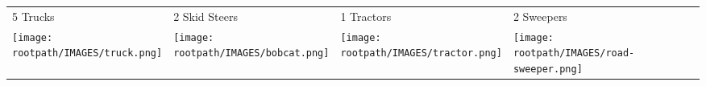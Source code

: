 \begin{tabular}{m{}m{}m{}m{}}
    {\color{ccorange} 5 Trucks} & {\color{ccorange} 2 Skid Steers} & {\color{ccorange} 1 Tractors} & {\color{ccorange} 2 Sweepers} \\
    \texttt{[image: \\rootpath/IMAGES/truck.png]}  & \texttt{[image: \\rootpath/IMAGES/bobcat.png]} & \texttt{[image: \\rootpath/IMAGES/tractor.png]} & \texttt{[image: \\rootpath/IMAGES/road-sweeper.png]}                         
    \end{tabular}
